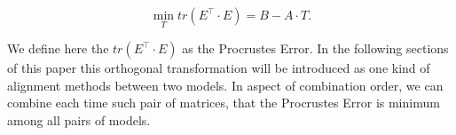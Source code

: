 	\begin{equation}
		\min_T tr(E^\intercal\cdot E) = B-A\cdot T.
	\end{equation}

	We define here the $tr(E^\intercal \cdot E)$ as the Procrustes Error. In the following sections of this paper this orthogonal transformation will be introduced as one kind of alignment methods between two models. In aspect of combination order, we can combine each time such pair of matrices, that the Procrustes Error is minimum among all pairs of models.